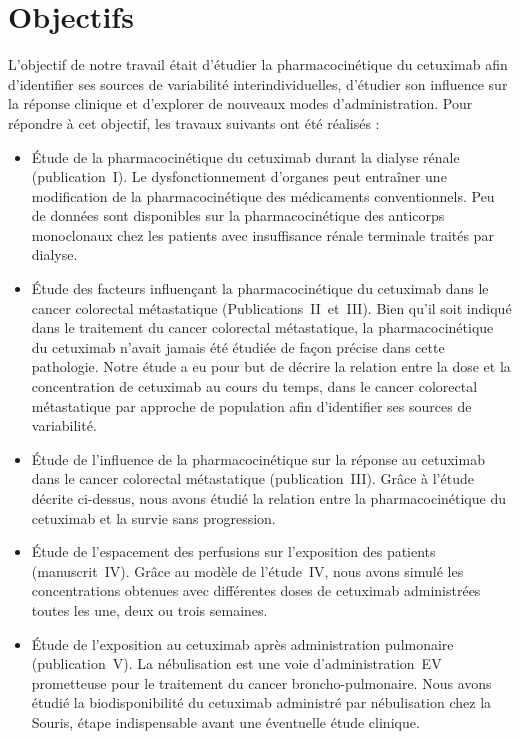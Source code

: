 ﻿\chapter{Objectifs}

L'objectif de notre travail était d'étudier la pharmacocinétique du cetuximab afin d'identifier ses sources de variabilité interindividuelles, d'étudier son influence sur la réponse clinique et d'explorer de nouveaux modes d'administration. Pour répondre à cet objectif, les travaux suivants ont été réalisés :


\begin{itemize}
\item Étude de la pharmacocinétique du cetuximab durant la dialyse rénale (publication~I). Le dysfonctionnement d'organes peut entraîner une modification de la pharmacocinétique des médicaments conventionnels. Peu de données sont disponibles sur la pharmacocinétique des anticorps monoclonaux chez les patients avec insuffisance rénale terminale traités par dialyse.


\item Étude des facteurs influençant la pharmacocinétique du cetuximab dans le cancer colorectal métastatique (Publications~II~et~III). Bien qu'il soit indiqué dans le traitement du cancer colorectal métastatique, la pharmacocinétique du cetuximab n'avait jamais été étudiée de façon précise dans cette pathologie. Notre étude a eu pour but de décrire la relation entre la dose et la concentration de cetuximab au cours du temps, dans le cancer colorectal métastatique par approche de population afin d'identifier ses sources de variabilité.


\item Étude de l'influence de la pharmacocinétique sur la réponse au cetuximab dans le cancer colorectal métastatique (publication~III). Grâce à l'étude décrite ci-dessus, nous avons étudié la relation entre la pharmacocinétique du cetuximab et la survie sans progression.


\item Étude de l'espacement des perfusions sur l'exposition des patients (manuscrit~IV). Grâce au modèle de l'étude~IV, nous avons simulé les concentrations obtenues avec différentes doses de cetuximab administrées toutes les une, deux ou trois semaines.


\item Étude de l'exposition au cetuximab après administration pulmonaire (publication~V). La nébulisation est une voie d'administration~EV prometteuse pour le traitement du cancer broncho-pulmonaire. Nous avons étudié la biodisponibilité du cetuximab administré par nébulisation chez la Souris, étape indispensable avant une éventuelle étude clinique.
\end{itemize}


